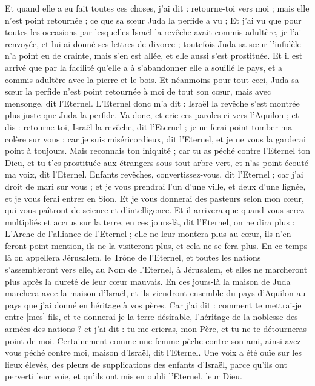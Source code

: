 \begin{multicols}{2}
Et quand elle a eu fait toutes ces choses, j'ai dit : retourne-toi vers moi ; mais elle n'est point retournée ; ce que sa sœur Juda la perfide a vu ;
Et j'ai vu que pour toutes les occasions par lesquelles Israël la revêche avait commis adultère, je l'ai renvoyée, et lui ai donné ses lettres de divorce ; toutefois Juda sa sœur l'infidèle n'a point eu de crainte, mais s'en est allée, et elle aussi s'est prostituée.
Et il est arrivé que par la facilité qu'elle a à s'abandonner elle a souillé le pays, et a commis adultère avec la pierre et le bois.
Et néanmoins pour tout ceci, Juda sa sœur la perfide n'est point retournée à moi de tout son cœur, mais avec mensonge, dit l'Eternel.
L'Eternel donc m'a dit : Israël la revêche s'est montrée plus juste que Juda la perfide.
Va donc, et crie ces paroles-ci vers l'Aquilon ; et dis : retourne-toi, Israël la revêche, dit l'Eternel ; je ne ferai point tomber ma colère sur vous ; car je suis miséricordieux, dit l'Eternel, et je ne vous la garderai point à toujours.
Mais reconnais ton iniquité ; car tu as péché contre l'Eternel ton Dieu, et tu t'es prostituée aux étrangers sous tout arbre vert, et n'as point écouté ma voix, dit l'Eternel.
Enfants revêches, convertissez-vous, dit l'Eternel ; car j'ai droit de mari sur vous ; et je vous prendrai l'un d'une ville, et deux d'une lignée, et je vous ferai entrer en Sion.
Et je vous donnerai des pasteurs selon mon cœur, qui vous paîtront de science et d'intelligence.
Et il arrivera que quand vous serez multipliés et accrus sur la terre, en ces jours-là, dit l'Eternel, on ne dira plus : L'Arche de l'alliance de l'Eternel ; elle ne leur montera plus au cœur, ils n'en feront point mention, ils ne la visiteront plus, et cela ne se fera plus.
En ce temps-là on appellera Jérusalem, le Trône de l'Eternel, et toutes les nations s'assembleront vers elle, au Nom de l'Eternel, à Jérusalem, et elles ne marcheront plus après la dureté de leur cœur mauvais.
En ces jours-là la maison de Juda marchera avec la maison d'Israël, et ils viendront ensemble du pays d'Aquilon au pays que j'ai donné en héritage à vos pères.
Car j'ai dit : comment te mettrai-je entre [mes] fils, et te donnerai-je la terre désirable, l'héritage de la noblesse des armées des nations ? et j'ai dit : tu me crieras, mon Père, et tu ne te détourneras point de moi.
Certainement comme une femme pèche contre son ami, ainsi avez-vous péché contre moi, maison d'Israël, dit l'Eternel.
Une voix a été ouïe sur les lieux élevés, des pleurs de supplications des enfants d'Israël, parce qu'ils ont perverti leur voie, et qu'ils ont mis en oubli l'Eternel, leur Dieu.

\end{multicols}
